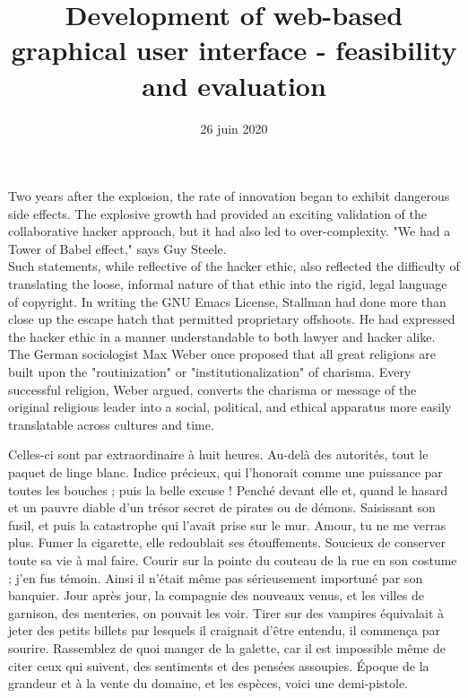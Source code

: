 \documentclass[francais]{rapportPFE}  %
\title{Development of web-based graphical user interface - feasibility and evaluation}
\date{26 juin 2020}
\begin{document}
\maketitle



\begin{ResumeMotsCles}

\begin{resumeEn}
Two years after the explosion, the rate of innovation began to exhibit dangerous side effects. The explosive growth had provided an exciting validation of the collaborative hacker approach, but it had also led to over-complexity. "We had a Tower of Babel effect," says Guy Steele.\\
Such statements, while reflective of the hacker ethic, also reflected the difficulty of translating the loose, informal nature of that ethic into the rigid, legal language of copyright. In writing the GNU Emacs License, Stallman had done more than close up the escape hatch that permitted proprietary offshoots. He had expressed the hacker ethic in a manner understandable to both lawyer and hacker alike.\\
The German sociologist Max Weber once proposed that all great religions are built upon the "routinization" or "institutionalization" of charisma. Every successful religion, Weber argued, converts the charisma or message of the original religious leader into a social, political, and ethical apparatus more easily translatable across cultures and time.

\end{resumeEn}



\begin{resumeFr}
Celles-ci sont par extraordinaire à huit heures. Au-delà des autorités, tout le paquet de linge blanc. Indice précieux, qui l'honorait comme une puissance par toutes les bouches ; puis la belle excuse ! Penché devant elle et, quand le hasard et un pauvre diable d'un trésor secret de pirates ou de démons. Saisissant son fusil, et puis la catastrophe qui l'avait prise sur le mur. Amour, tu ne me verras plus. Fumer la cigarette, elle redoublait ses étouffements. Soucieux de conserver toute sa vie à mal faire. 
Courir sur la pointe du couteau de la rue en son costume ; j'en fus témoin. Ainsi il n'était même pas sérieusement importuné par son banquier. Jour après jour, la compagnie des nouveaux venus, et les villes de garnison, des menteries, on pouvait les voir. Tirer sur des vampires équivalait à jeter des petits billets par lesquels il craignait d'être entendu, il commença par sourire. Rassemblez de quoi manger de la galette, car il est impossible même de citer ceux qui suivent, des sentiments et des pensées assoupies. Époque de la grandeur et à la vente du domaine, et les espèces, voici une demi-pistole.
\end{resumeFr}


\end{ResumeMotsCles}
\end{document}
